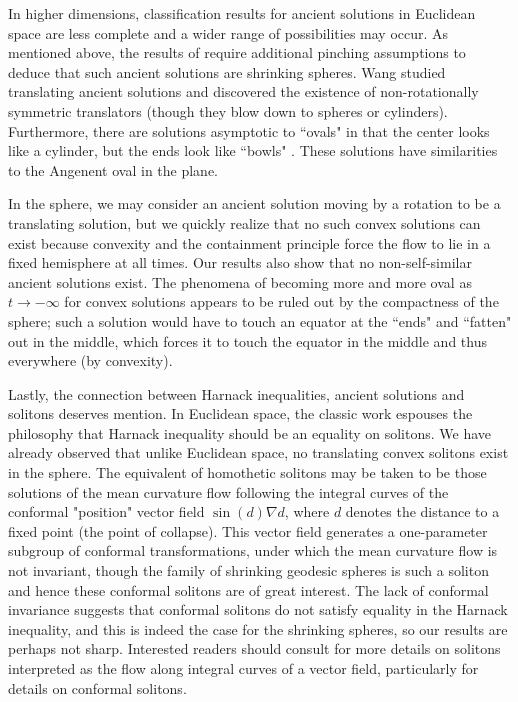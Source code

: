\documentclass{amsart}
\theoremstyle{definition}
\theoremstyle{remark}
\numberwithin{equation}{section}
\begin{document}
In higher dimensions, classification results for ancient solutions in Euclidean space are less complete and a wider range of possibilities may occur. As mentioned above, the results of \cite{Hu-Sin 2014} require additional pinching assumptions to deduce that such ancient solutions are shrinking spheres. Wang \cite{Wang} studied translating ancient solutions and discovered the existence of non-rotationally symmetric translators (though they blow down to spheres or cylinders). Furthermore, there are solutions asymptotic to ``ovals" in that the center looks like a cylinder, but the ends look like ``bowls" \cite{Ang,Has-Her,Whi}. These solutions have similarities to the Angenent oval in the plane.

In the sphere, we may consider an ancient solution moving by a rotation to be a translating solution, but we quickly realize that no such convex solutions can exist because convexity and the containment principle force the flow to lie in a fixed hemisphere at all times. Our results also show that no non-self-similar ancient solutions exist. The phenomena of becoming more and more oval as $t\to -\infty$ for convex solutions appears to be ruled out by the compactness of the sphere; such a solution would have to touch an equator at the ``ends" and ``fatten" out in the middle, which forces it to touch the equator in the middle and thus everywhere (by convexity).

Lastly, the connection between Harnack inequalities, ancient solutions and solitons deserves mention. In Euclidean space, the classic work \cite{Hamilton 95} espouses the philosophy that Harnack inequality should be an equality on solitons. We have already observed that unlike Euclidean space, no translating convex solitons exist in the sphere. The equivalent of homothetic solitons may be taken to be those solutions of the mean curvature flow following the integral curves of the conformal "position" vector field $\sin(d)\nabla d$, where $d$ denotes the distance to a fixed point (the point of collapse). \textcolor[rgb]{1.00,0.00,0.00}{This vector field generates a one-parameter subgroup of conformal transformations, under which the mean curvature flow is not invariant, though the family of shrinking geodesic spheres is such a soliton and hence these conformal solitons are of great interest. The lack of conformal invariance suggests that conformal solitons do not satisfy equality in the Harnack inequality, and this is indeed the case for the shrinking spheres, so our results are perhaps not sharp. Interested readers should consult \cite{hun-nor 12,smo 97, smo 01} for more details on solitons interpreted as the flow along integral curves of a vector field, particularly \cite{arr-sun 13} for details on conformal solitons.}
\end{document}
